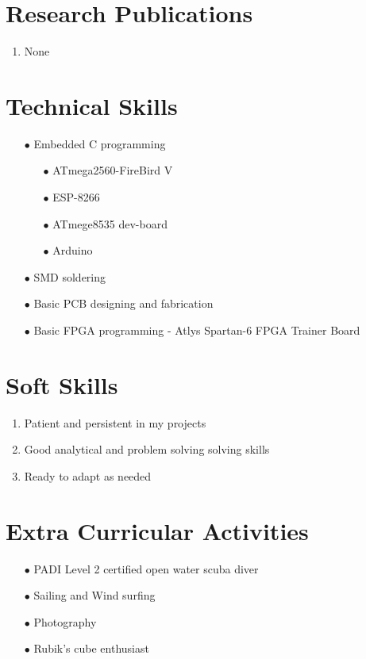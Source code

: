 \documentclass{article}
\begin{document}
	\section*{Research Publications}
	\begin{enumerate}
		\item None
	\end{enumerate}

	\section*{Technical Skills}
		\begin{itemize}
			\item[$\bullet$] Embedded C programming
			\begin{itemize}
				\item[$\bullet$] ATmega2560-FireBird V
				\item[$\bullet$] ESP-8266
				\item[$\bullet$] ATmege8535 dev-board
				\item[$\bullet$] Arduino
			\end{itemize}
			\item[$\bullet$] SMD soldering
			\item[$\bullet$] Basic PCB designing and fabrication
			\item[$\bullet$] Basic FPGA programming - Atlys Spartan-6 FPGA Trainer Board
		\end{itemize}
	
	\section*{Soft Skills}
		\begin{enumerate}
			\item Patient and persistent in my projects
			\item Good analytical and problem solving solving skills
			\item Ready to adapt as needed
		\end{enumerate}	

	\section*{Extra Curricular Activities}
		\begin{itemize}
			\item[$\bullet$] PADI Level 2 certified open water scuba diver
			\item[$\bullet$] Sailing and Wind surfing
			\item[$\bullet$] Photography 
			\item[$\bullet$] Rubik’s cube enthusiast 
		\end{itemize}	
	
\end{document}
